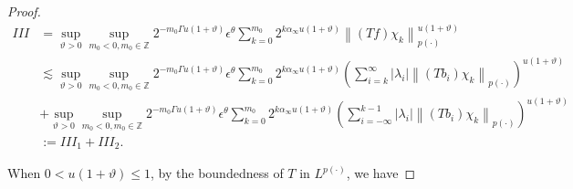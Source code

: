 \documentclass[10pt,a4paper]{amsart}
\begin{document}
\begin{proof}
\begin{align*}
I I I&=  \sup_{\vartheta>0 }\sup _{m_0<0, m_0\in  \mathbb{Z}} 2^{-m_0\Gamma u(1+\vartheta)} \epsilon  ^\theta \sum_{k=0}^{m_0} 2^{k  \alpha_{\infty}u(1+\vartheta)}\left\|(T f) \chi_{k}\right\|_{{p(\cdot)}}^{u(1+\vartheta)} \\
& \lesssim \sup_{\vartheta>0 }\sup _{m_0<0, m_0\in  \mathbb{Z}} 2^{-m_0\Gamma u(1+\vartheta)} \epsilon  ^\theta \sum_{k=0}^{m_0} 2^{k  \alpha_{\infty}u(1+\vartheta)}\left(\sum_{i=k}^{\infty}\left|\lambda_{i}\right|\left\|\left(T b_{i}\right) \chi_{k}\right\|_{{p(\cdot)}}\right)^{u(1+\vartheta)} \\
& +\sup_{\vartheta>0 }\sup _{m_0<0, m_0\in  \mathbb{Z}} 2^{-m_0\Gamma u(1+\vartheta)} \epsilon  ^\theta \sum_{k=0}^{m_0} 2^{k  \alpha_{\infty}u(1+\vartheta)}\left(\sum_{i=-\infty}^{k-1}\left|\lambda_{i}\right|\left\|\left(T b_{i}\right) \chi_{k}\right\|_{{p(\cdot)}}\right)^{u(1+\vartheta)} \\
& :=I I I_{1}+I I I_{2} . \tag{89}
\end{align*}


When $0<u(1+\vartheta) \leq  1$, by the boundedness of $T$ in $L^{p(\cdot)}$, we have



\end{proof}
\end{document}
